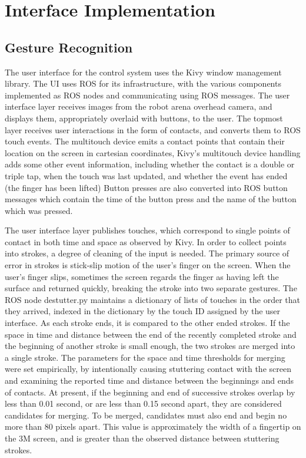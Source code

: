 \chapter{Interface Implementation}
\thispagestyle{fancy}

\section{Gesture Recognition}

The user interface for the control system uses the Kivy window management library. 
The UI uses ROS for its infrastructure, with the various components implemented as ROS nodes and communicating using ROS messages.
The user interface layer receives images from the robot arena overhead camera, and displays them, appropriately overlaid with buttons, to the user. 
The topmost layer receives user interactions in the form of contacts, and converts them to ROS touch events. The multitouch device emits a contact points that contain their location on the screen in cartesian coordinates, 
Kivy's multitouch device handling adds some other event information, including whether the contact is a double or triple tap, when the touch was last updated, and whether the event has ended (the finger has been lifted) 
Button presses are also converted into ROS button messages which contain the time of the button press and the name of the button which was pressed. 

The user interface layer publishes touches, which correspond to single points of contact in both time and space as observed by Kivy. 
In order to collect points into strokes, a degree of cleaning of the input is needed. 
The primary source of error in strokes is stick-slip motion of the user's finger on the screen. 
When the user's finger slips, sometimes the screen regards the finger as having left the surface and returned quickly, breaking the stroke into two separate gestures. 
The ROS node destutter.py maintains a dictionary of lists of touches in the order that they arrived, indexed in the dictionary by the touch ID assigned by the user interface. 
As each stroke ends, it is compared to the other ended strokes. 
If the space in time and distance between the end of the recently completed stroke and the beginning of another stroke is small enough, the two strokes are merged into a single stroke. 
The parameters for the space and time thresholds for merging were set empirically, by intentionally causing stuttering contact with the screen and examining the reported time and distance between the beginnings and ends of contacts. 
At present, if the beginning and end of successive strokes overlap by less than 0.01 second, or are less than 0.15 second apart, they are considered candidates for merging. 
To be merged, candidates must also end and begin no more than 80 pixels apart. 
This value is approximately the width of a fingertip on the 3M screen, and is greater than the observed distance between stuttering strokes. 

